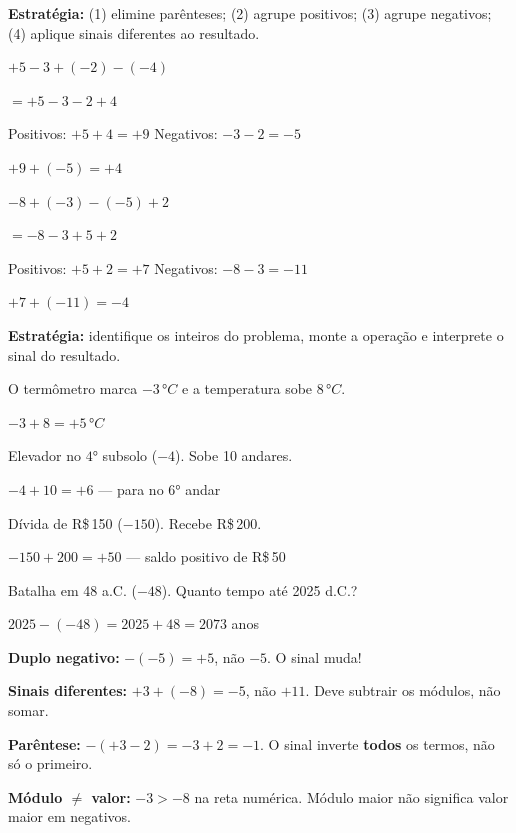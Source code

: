\documentclass[12pt,twoside]{article}
\begin{document}
\begin{multicols}{2}

\textbf{Estratégia:} (1) elimine parênteses; (2) agrupe positivos; (3) agrupe negativos; (4) aplique sinais diferentes ao resultado.


$+5 - 3 + (-2) - (-4)$

$= +5 - 3 - 2 + 4$

Positivos: $+5 + 4 = +9$ \quad Negativos: $-3 - 2 = -5$

$+9 + (-5) = +4$ \checkmark


$-8 + (-3) - (-5) + 2$

$= -8 - 3 + 5 + 2$

Positivos: $+5 + 2 = +7$ \quad Negativos: $-8 - 3 = -11$

$+7 + (-11) = -4$ \checkmark


\textbf{Estratégia:} identifique os inteiros do problema, monte a operação e interprete o sinal do resultado.


O termômetro marca $-3\,°C$ e a temperatura sobe $8\,°C$.

$-3 + 8 = +5\,°C$ \checkmark


Elevador no $4°$ subsolo ($-4$). Sobe 10 andares.

$-4 + 10 = +6$ — para no $6°$ andar \checkmark


Dívida de R\$\,150 ($-150$). Recebe R\$\,200.

$-150 + 200 = +50$ — saldo positivo de R\$\,50 \checkmark


Batalha em 48 a.C. ($-48$). Quanto tempo até 2025 d.C.?

$2025 - (-48) = 2025 + 48 = 2073$ anos \checkmark


\textbf{Duplo negativo:} $-(-5) = +5$, não $-5$. O sinal muda!

\textbf{Sinais diferentes:} $+3 + (-8) = -5$, não $+11$. Deve subtrair os módulos, não somar.

\textbf{Parêntese:} $-(+3-2) = -3+2 = -1$. O sinal inverte \textbf{todos} os termos, não só o primeiro.

\textbf{Módulo $\neq$ valor:} $-3 > -8$ na reta numérica. Módulo maior não significa valor maior em negativos.

\end{multicols}
\end{document}
